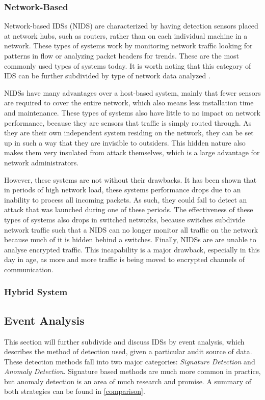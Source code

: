 \documentclass{acm_proc_article-sp}
\begin{document}
    	\subsubsection{Network-Based}
    		Network-based IDSs (NIDS) are characterized by having detection sensors placed at network hubs, such as routers, rather than on each individual machine in a network. These types of systems work by monitoring network traffic looking for patterns in flow or analyzing packet headers for trends. These are the most commonly used types of systems today. It is worth noting that this category of IDS can be further subdivided by type of network data analyzed \cite{Bhuyan2011}. 
    		
    		NIDSs have many advantages over a host-based system, mainly that fewer sensors are required to cover the entire network, which also means less installation time and maintenance. These types of systems also have little to no impact on network performance, because they are sensors that traffic is simply routed through. As they are their own independent system residing on the network, they can be set up in such a way that they are invisible to outsiders. This hidden nature also makes them very insulated from attack themselves, which is a large advantage for network administrators. 
    		
    		However, these systems are not without their drawbacks. It has been shown that in periods of high network load, these systems performance drops due to an inability to process all incoming packets. As such, they could fail to detect an attack that was launched during one of these periods. The effectiveness of these types of systems also drops in switched networks, because switches subdivide network traffic such that a NIDS can no longer monitor all traffic on the network because much of it is hidden behind a switches. Finally, NIDSs are are unable to analyse encrypted traffic. This incapability is a major drawback, especially in this day in age, as more and more traffic is being moved to encrypted channels of communication. 		
    	\subsubsection{Hybrid System}
    \subsection{Event Analysis}
   		This section will further subdivide and discuss IDSs by event analysis, which describes the method of detection used, given a particular audit source of data. These detection methods fall into two major categories: \emph{Signature Detection} and \emph{Anomaly Detection}. Signature based methods are much more common in practice, but anomaly detection is an area of much research and promise. A summary of both strategies can be found in \ref{comparison}.
\end{document}

